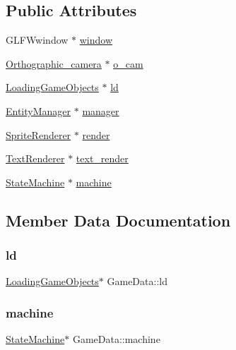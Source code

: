 \subsection*{Public Attributes}
\begin{DoxyCompactItemize}
\item 
G\+L\+F\+Wwindow $\ast$ \hyperlink{structGameData_af9735787501e4c8c1d26787c322cd6dd}{window}
\item 
\hyperlink{classOrthographic__camera}{Orthographic\+\_\+camera} $\ast$ \hyperlink{structGameData_a9e133f6b5e0d19889e94505db479ca69}{o\+\_\+cam}
\item 
\hyperlink{classLoadingGameObjects}{Loading\+Game\+Objects} $\ast$ \hyperlink{structGameData_aaaddd2c1ea34ab4acc9a732879fd92ab}{ld}
\item 
\hyperlink{classEntityManager}{Entity\+Manager} $\ast$ \hyperlink{structGameData_afe20255f5a9a5a93b581cd333ac75853}{manager}
\item 
\hyperlink{classSpriteRenderer}{Sprite\+Renderer} $\ast$ \hyperlink{structGameData_a85da8dd3e426c436097a9f62b34a59f1}{render}
\item 
\hyperlink{classTextRenderer}{Text\+Renderer} $\ast$ \hyperlink{structGameData_a64a9de895cbaf5200a75085c894217f0}{text\+\_\+render}
\item 
\hyperlink{classStateMachine}{State\+Machine} $\ast$ \hyperlink{structGameData_a22d18ba95d18acdf0e77c8c1591c1ec7}{machine}
\end{DoxyCompactItemize}


\subsection{Member Data Documentation}
\mbox{\label{structGameData_aaaddd2c1ea34ab4acc9a732879fd92ab}} 
\subsubsection{\texorpdfstring{ld}{ld}}
{\footnotesize\ttfamily \hyperlink{classLoadingGameObjects}{Loading\+Game\+Objects}$\ast$ Game\+Data\+::ld}

\mbox{\label{structGameData_a22d18ba95d18acdf0e77c8c1591c1ec7}} 
\subsubsection{\texorpdfstring{machine}{machine}}
{\footnotesize\ttfamily \hyperlink{classStateMachine}{State\+Machine}$\ast$ Game\+Data\+::machine}

